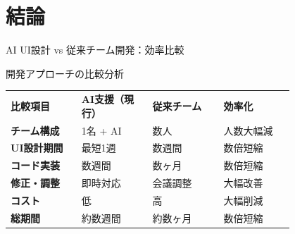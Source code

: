 \documentclass[10pt,aspectratio=169]{beamer}
\begin{document}
\section{結論}
\begin{frame}[t]{AI UI設計 vs 従来チーム開発：効率比較}
  \small
  \begin{block}{開発アプローチの比較分析}
    \setlength{\tabcolsep}{7pt}
    \renewcommand{\arraystretch}{1.6}
    \begin{tabular}{>{\raggedright\arraybackslash}p{0.2\linewidth} >{\centering\arraybackslash}p{0.2\linewidth} >{\centering\arraybackslash}p{0.2\linewidth} >{\centering\arraybackslash}p{0.2\linewidth}}
      \rowcolor{tsinghua!15}
      \textbf{比較項目} & \textbf{AI支援（現行）} & \textbf{従来チーム} & \textbf{効率化}\tabularnewline
      \textbf{チーム構成} & 1名 + AI & 数人 & \textcolor{red!80!black}{人数大幅減}\tabularnewline
      \textbf{UI設計期間} & 最短1週 & 数週間 & \textcolor{red!80!black}{数倍短縮}\tabularnewline
      \textbf{コード実装} & 数週間 & 数ヶ月 & \textcolor{red!80!black}{数倍短縮}\tabularnewline
      \textbf{修正・調整} & 即時対応 & 会議調整 & \textcolor{red!80!black}{大幅改善}\tabularnewline
      \textbf{コスト} & 低 & 高 & \textcolor{red!80!black}{大幅削減}\tabularnewline
      \rowcolor{green!10}
      \textbf{総期間} & \textcolor{blue!70!black}{約数週間} & \textcolor{red!70!black}{約数ヶ月} & \textcolor{green!40!black}{数倍短縮}\tabularnewline
    \end{tabular}

    \vspace{0.6em}
  \end{block}
\end{frame}
\end{document}
